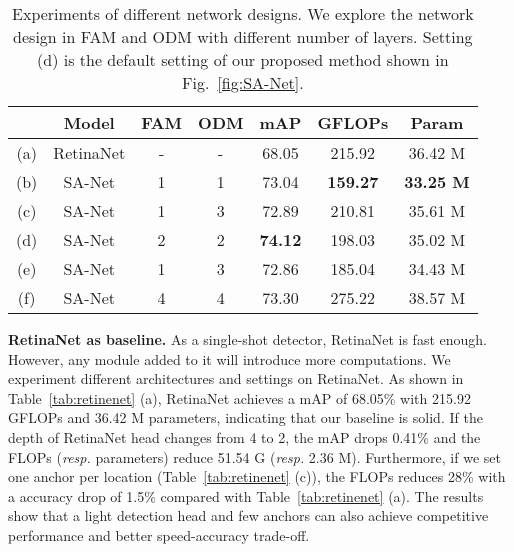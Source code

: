 \documentclass[10pt,journal,final]{IEEEtran}
\begin{document}
\begin{table}[t!]
  \caption{Experiments of different network designs. We explore the network design in FAM and ODM with different number of layers. Setting (d) is the default setting of our proposed method shown in Fig.~\ref{fig:SA-Net}.}
  \vspace{-3mm}
    

\begin{center}
\begin{tabular}{c|c|c|c|c|c|c} \hline
        & Model            &FAM  &ODM    & mAP          & GFLOPs          & Param \\ \hline
    (a) & RetinaNet        & -   & -     &68.05         & 215.92          & 36.42 M      \\
    (b) & SA-Net       & 1   & 1     &73.04         & \textbf{159.27} & \textbf{33.25 M} \\
    (c) & SA-Net       & 1   & 3     &72.89         & 210.81          & 35.61 M      \\
    (d) & SA-Net       & 2   & 2     &\textbf{74.12}& 198.03          & 35.02 M      \\
    (e) & SA-Net       & 1   & 3     &72.86         & 185.04          & 34.43 M      \\
    (f) & SA-Net       & 4   & 4     &73.30         & 275.22          & 38.57 M      \\ \hline
    \end{tabular}
    \end{center}     \label{tab:net_design}
  \vspace{-3mm}
\end{table}

{\bf RetinaNet as baseline.} As a single-shot detector, RetinaNet is fast enough. However, any module added to it will introduce more computations. We experiment different architectures and settings on RetinaNet. As shown in Table~\ref{tab:retinenet} (a), RetinaNet achieves a mAP of 68.05\% with 215.92 GFLOPs and 36.42 M parameters, indicating that our baseline is solid. If the depth of RetinaNet head changes from 4 to 2, the mAP drops 0.41\% and the FLOPs (\emph{resp.} parameters) reduce 51.54 G (\emph{resp.} 2.36 M). Furthermore, if we set one anchor per location (Table~\ref{tab:retinenet} (c)), the FLOPs reduces 28\% with a accuracy drop of 1.5\% compared with Table~\ref{tab:retinenet} (a). The results show that a light detection head and few anchors can also achieve competitive performance and better speed-accuracy trade-off.
\end{document}
